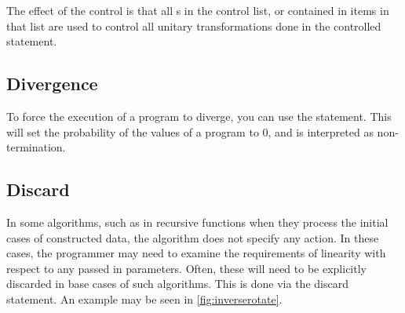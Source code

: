 The effect of the control is that all \qbit{}s in the 
control list, or contained in items
in that list are used to control all unitary 
transformations done in the controlled
statement.

\subsection{Divergence}\label{subsec:nontermination}
To force the execution  of a program  to diverge, you can use the
 statement. This will set the probability of the values of
a program to 0, and is interpreted as non-termination.

\subsection{Discard}\label{subsec:discard}
In some algorithms, such as  in recursive functions when they process
the initial cases of constructed data,
the algorithm does not specify any action. In these cases, the programmer
may need to examine the requirements of linearity with respect to 
any passed in parameters. Often, these will need to be explicitly
discarded in base cases of such algorithms.
This is done via the discard statement.
An example may be seen in \vref{fig:inverserotate}.